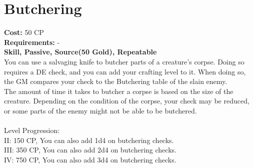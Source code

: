 \section{Butchering}\label{perk:butchering}
\textbf{Cost:} 50 CP\\
\textbf{Requirements:} -\\
\textbf{Skill, Passive, Source(50 Gold), Repeatable}\\
You can use a salvaging knife to butcher parts of a creature's corpse.
Doing so requires a DE check, and you can add your crafting level to it.
When doing so, the GM compares your check to the Butchering table of the slain enemy.\\
The amount of time it takes to butcher a corpse is based on the size of the creature.
Depending on the condition of the corpse, your check may be reduced, or some parts of the enemy might not be able to be butchered.\\
\\
Level Progression:\\
II: 150 CP, You can also add 1d4 on butchering checks.\\
III: 350 CP, You can also add 2d4 on butchering checks.\\
IV: 750 CP, You can also add 3d4 on butchering checks.\\